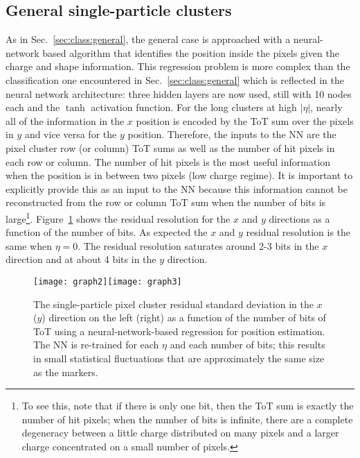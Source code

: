 \documentclass[12pt]{article}
\begin{document}
\clearpage

\subsection{General single-particle clusters}
\label{sec:ressingleparts}


As in Sec.~\ref{sec:class:general}, the general case is approached with a neural-network based algorithm that identifies the position inside the pixels given the charge and shape information.  This regression problem is more complex than the classification one encountered in Sec.~\ref{sec:class:general} which is reflected in the neural network architecture: three hidden layers are now used, still with 10 nodes each and the $\tanh$ activation function.  For the long clusters at high $|\eta|$, nearly all of the information in the $x$ position is encoded by the ToT sum over the pixels in $y$ and vice versa for the $y$ position.  Therefore, the inputs to the NN are the pixel cluster row (or column) ToT sums as well as the number of hit pixels in each row or column.  The number of hit pixels is the most useful information when the position is in between two pixels (low charge regime).  It is important to explicitly provide this as an input to the NN because this information cannot be reconstructed from the row or column ToT sum when the number of bits is large\footnote{To see this, note that if there is only one bit, then the ToT sum is exactly the number of hit pixels; when the number of bits is infinite, there are a complete degeneracy between a little charge distributed on many pixels and a larger charge concentrated on a small number of pixels.}.   Figure~\ref{fig:resolution:NN1} shows the residual resolution for the $x$ and $y$ directions as a function of the number of bits.  As expected the $x$ and $y$ residual resolution is the same when $\eta=0$.  The residual resolution saturates around 2-3 bits in the $x$ direction and at about 4 bits in the $y$ direction.


\begin{figure}[h!]
\centering
\texttt{[image: graph2]}\texttt{[image: graph3]}
\caption{The single-particle pixel cluster residual standard deviation in the $x$ ($y$) direction on the left (right) as a function of the number of bits of ToT using a neural-network-based regression for position estimation.  The NN is re-trained for each $\eta$ and each number of bits; this results in small statistical fluctuations that are approximately the same size as the markers.}
\label{fig:resolution:NN1}
\end{figure}
\end{document}
